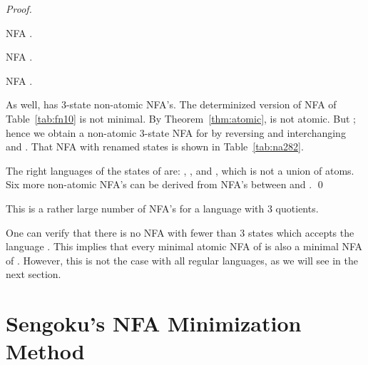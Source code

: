 \documentclass{llncs}
\newcommand{\qedb}{\hfill}
\begin{document}
\begin{example}
\begin{proof}
\begin{table}[hbt]
\begin{minipage}[b]{0.45\linewidth}
\begin{center}
\end{center}
\end{minipage}
\end{table}

\begin{table}[h]
\begin{minipage}[b]{0.45\linewidth}
\caption{NFA .}
\label{tab:fn26}
\begin{center}

\end{center}
\end{minipage}
\hspace{0.2cm}
\begin{minipage}[b]{0.45\linewidth}
\caption{NFA .}
\label{tab:fn281}
\begin{center}

\end{center}
\end{minipage}
\end{table}
\begin{table}[htb]
\caption{NFA .}
\label{tab:na282}
\begin{center}

\end{center}
\end{table}

As well,  has 3-state non-atomic NFA's.
The determinized version of NFA  of Table~\ref{tab:fn10} is not minimal.
By Theorem~\ref{thm:atomic},  is not atomic. But ;
hence we obtain a non-atomic 3-state NFA for  by reversing  and interchanging  and .
That NFA with renamed states is shown in Table~\ref{tab:na282}.

The right languages of the states of  are:
, 
, and
, which is not a union of atoms.
Six more non-atomic NFA's can be derived from NFA's between  and  .
\qed
\end{proof}


This is a rather large number of NFA's for a language with  3 quotients. 
\qedb
\end{example}

One can verify that there is no NFA with fewer than 3 states which
accepts the language .
This implies that every minimal atomic NFA of  is also 
a minimal NFA of .
However, this is not the case with all regular languages, as we will see 
in the next section. 


\section{Sengoku's NFA Minimization Method}
\label{sec:Sengoku}
\end{document}
